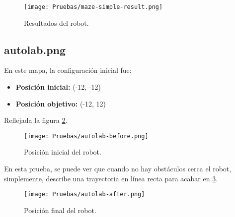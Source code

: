 \documentclass[a4paper, 11pt]{article}
\begin{document}
		\begin{figure}[H]
			\centering
			\texttt{[image: Pruebas/maze-simple-result.png]}
			\caption{Resultados del robot.}
			\label{res-ms}	
		\end{figure}
		
	
	\subsection{autolab.png}
		En este mapa, la configuración inicial fue:
	
		\begin{itemize}
			\item \textbf{Posición inicial:} (-12, -12)
			\item \textbf{Posición objetivo:} (-12, 12)
		\end{itemize}
		
		Reflejada la figura \ref{begin-a}.
		
		\begin{figure}[H]
			\centering
			\texttt{[image: Pruebas/autolab-before.png]}
			\caption{Posición inicial del robot.}
			\label{begin-a}	
		\end{figure}
		
		En esta prueba, se puede ver que cuando no hay obstáculos cerca el robot, simplemente, describe
		una trayectoria en línea recta para acabar en \ref{end-a}.		
		
		\begin{figure}[H]
			\centering
			\texttt{[image: Pruebas/autolab-after.png]}
			\caption{Posición final del robot.}
			\label{end-a}	
		\end{figure}
\end{document}

